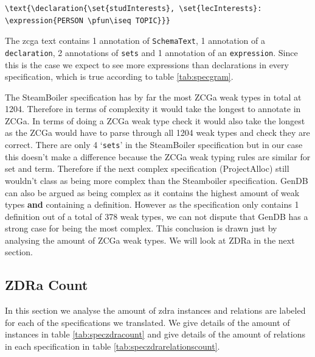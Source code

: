 \begin{verbatim}
\text{\declaration{\set{studInterests}, \set{lecInterests}:
\expression{PERSON \pfun\iseq TOPIC}}}
\end{verbatim}

The \gls{zcga} text contains 1 annotation of \texttt{SchemaText}, 1 annotation
of a \texttt{declaration}, 2 annotations of \texttt{sets} and 1 annotation of an
\texttt{expression}. Since this is the case we expect to see more expressions
than declarations in every specification, which is true according to table
\ref{tab:specgram}.

The SteamBoiler specification has by far the most ZCGa weak types in total at 1204.
Therefore in terms of complexity it would take the longest to annotate in ZCGa.
In terms of doing a ZCGa weak type check it would also take the longest as the ZCGa
would have to parse through all 1204 weak types and check they are correct.
There are only 4 `\texttt{sets}' in the SteamBoiler specification but in our case
this doesn't make a difference because the ZCGa weak typing rules are similar for set
and term. Therefore if the next complex specification (ProjectAlloc) still wouldn't class
as being more complex than the Steamboiler specification. 
GenDB can also be argued as being complex as it contains the highest amount of weak types
 \textbf{and} containing a definition. However as the specification only contains 1 
 definition out of a total of 378 weak types, we can not dispute that GenDB has a strong
 case for being the most complex. This conclusion is drawn just by analysing 
the amount of ZCGa weak types. We will look at ZDRa in the next section.

\subsection{ZDRa Count}

In this section we analyse the amount of \gls{zdra} instances and relations are
labeled for each of the specifications we translated. We give details of the
amount of instances in table \ref{tab:speczdracount} and give details of the
amount of relations in each specification in table
\ref{tab:speczdrarelationscount}.


